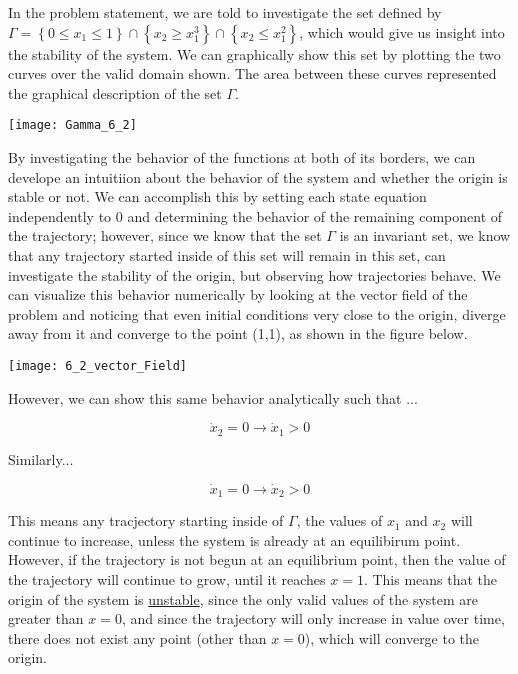 In the problem statement, we are told to investigate the set defined by $\Gamma=\left\{0 \leq x_{1} \leq 1\right\} \cap\left\{x_{2} \geq x_{1}^{3}\right\} \cap\left\{x_{2} \leq x_{1}^{2}\right\}$, which would give us insight into the stability of the system. We can graphically show this set by plotting the two curves over the valid domain shown. The area between these curves represented the graphical description of the set $\Gamma$. \\


\begin{center}
  \texttt{[image: Gamma\_6\_2]}
\end{center}



\noindent By investigating the behavior of the functions at both of its borders, we can develope an intuitiion about the behavior of the system and whether the origin is stable or not. We can accomplish this by setting each state equation independently to $0$ and determining the behavior of the remaining component of the trajectory; however, since we know that the set $\Gamma$ is an invariant set, we know that any trajectory started inside of this set will remain in this set, can investigate the stability of the origin, but observing how trajectories behave. We can visualize this behavior numerically by looking at the vector field of the problem and noticing that even initial conditions very close to the origin, diverge away from it and converge to the point (1,1), as shown in the figure below.


\begin{center}
  \texttt{[image: 6\_2\_vector\_Field]}
\end{center}


\noindent However, we can show this same behavior analytically such that ...

$$
\dot{x}_2 = 0 \rightarrow  \dot{x}_1 > 0
$$

\noindent Similarly...

$$
\dot{x}_1 = 0 \rightarrow \dot{x}_2 > 0
$$

\noindent This means any tracjectory starting inside of $\Gamma$, the values of $x_1$ and $x_2$ will continue to increase, unless the system is already at an equilibirum point. However, if the trajectory is not begun at an equilibrium point, then the value of the trajectory will continue to grow, until it reaches $x =1$. This means that the origin of the system is \underline{unstable}, since the only valid values of the system are greater than $x=0$, and since the trajectory will only increase in value over time, there does not exist any point (other than $x=0$), which will converge to the origin.

 
